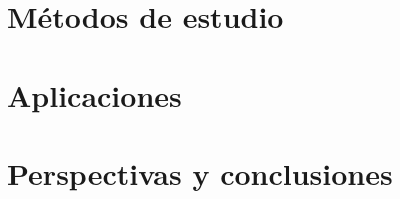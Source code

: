 \documentclass[fleqn,10pt]{SelfArx} %
\begin{document}
\section{Métodos de estudio}

\section{Aplicaciones}

\section{Perspectivas y conclusiones}









\newpage
{}



\end{document}
